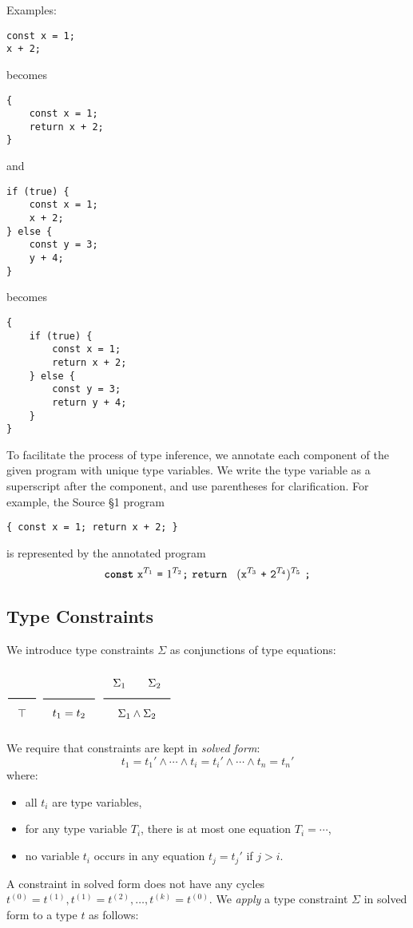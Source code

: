 Examples:

\begin{lstlisting}
const x = 1;
x + 2; 
\end{lstlisting}
becomes
\begin{lstlisting}
{
    const x = 1;
    return x + 2;
}    
\end{lstlisting}
and
\begin{lstlisting}
if (true) {
    const x = 1;    
    x + 2;
} else {
    const y = 3;
    y + 4;
}
\end{lstlisting}
becomes
\begin{lstlisting}
{
    if (true) {
        const x = 1;    
        return x + 2;
    } else {
        const y = 3;
        return y + 4;
    }
}
\end{lstlisting}

To facilitate the process of type inference, we annotate each component of the given
program with unique type variables. We write the type variable as a superscript after
the component, and use parentheses for clarification. For example, the Source \S 1
program
\begin{lstlisting}
{ const x = 1; return x + 2; }
\end{lstlisting}
is represented by the annotated program
\[ 
\Const\ \texttt{x}^{T_1}\ \texttt{=}\ 1^{T_2}\texttt{;}\ 
\texttt{return }\ (\texttt{x}^{T_3} \ \texttt{+} \ \texttt{2}^{T_4})^{T_5} \ \texttt{;}
\]

\subsection{Type Constraints}

We introduce type constraints $\Sigma$ as conjunctions of type equations:

$\Rule{}{\top}$
\hfill 
$\Rule{}{t_1 = t_2}$
\hfill 
$\Rule{\Sigma_1 \qquad \Sigma_2}{\Sigma_1 \wedge \Sigma_2}$

\noindent
We require that constraints are kept in \emph{solved form}:
\[
t_1 = t_1' \wedge \cdots \wedge t_i = t_i' \wedge \cdots \wedge t_n = t_n'
\]
where:
\begin{itemize}
\item all $t_i$ are type variables,
\item for any type variable $T_i$, there is at most one equation $T_i = \cdots$,
\item no variable $t_i$ occurs in any equation $t_j = t_j'$ if $j > i$.
\end{itemize}
A constraint in solved form does not have any cycles $t^{(0)} = t^{(1)}, t^{(1)} = t^{(2)}, \ldots, t^{(k)} = t^{(0)}$.
We \emph{apply} a type constraint $\Sigma$ in solved form to a type $t$ as follows:

